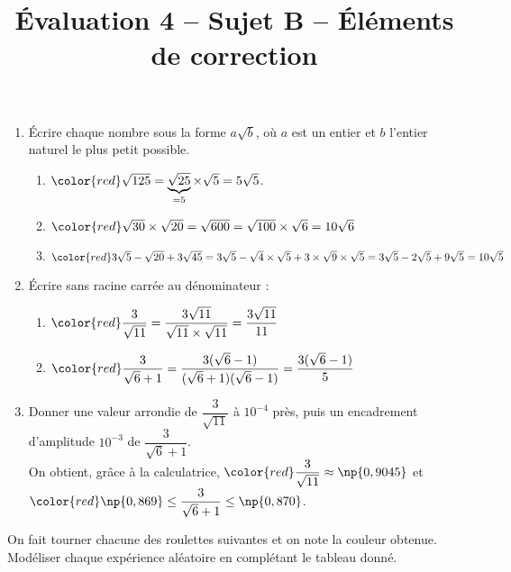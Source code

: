 \documentclass[a4paper,dvipsnames]{article}
\begin{document}
\title{Évaluation 4 -- Sujet B -- Éléments de correction}
\author{}
\date{}

\maketitle{}

\pagestyle{empty}

\exo\vspace{-2mm} 
\begin{enumerate}
  \item Écrire chaque nombre sous la forme $a\sqrt{b}$, où $a$ est un entier et $b$ l'entier naturel le plus petit possible.

    \begin{enumerate}
      \item $\color{red}\sqrt{125}=\underbrace{\sqrt{25}}_{=5}\times\sqrt{5}=5\sqrt{5}$.
      \item $\color{red}\sqrt{30}\times\sqrt{20}=\sqrt{600}=\sqrt{100}\times\sqrt{6}=10\sqrt{6}$
      \item $\color{red}3\sqrt{5}-\sqrt{20}+3\sqrt{45}=3\sqrt{5}-\sqrt{4}\times\sqrt{5}+3\times\sqrt{9}\times\sqrt{5}=3\sqrt{5}-2\sqrt{5}+9\sqrt{5}=10\sqrt{5}$
    \end{enumerate}
  \item Écrire sans racine carrée au dénominateur :

    \begin{multicols}{2}
      \begin{enumerate}
	\item $\color{red}\dfrac{3}{\sqrt{11}}=\dfrac{3\sqrt{11}}{\sqrt{11}\times\sqrt{11}}=\dfrac{3\sqrt{11}}{11}$
	\item $\color{red}\dfrac{3}{\sqrt{6}+1}=\dfrac{3(\sqrt{6}-1)}{(\sqrt{6}+1)(\sqrt{6}-1)}=\dfrac{3(\sqrt{6}-1)}{5}$
      \end{enumerate} 
    \end{multicols}

  \item Donner une valeur arrondie de $\dfrac{3}{\sqrt{11}}$ à $10^{-4}$ près, puis un encadrement d'amplitude $10^{-3}$ de $\dfrac{3}{\sqrt{6}+1}$.\\
    On obtient, grâce à la calculatrice, $\color{red}\dfrac{3}{\sqrt{11}}\approx \np{0,9045}$ et $\color{red}\np{0,869}\leq \dfrac{3}{\sqrt{6}+1}\leq \np{0,870}$.
\end{enumerate}

\bigskip

\exo On fait tourner chacune des roulettes suivantes et on note la couleur obtenue. Modéliser chaque expérience aléatoire en complétant le tableau donné.
\end{document}
